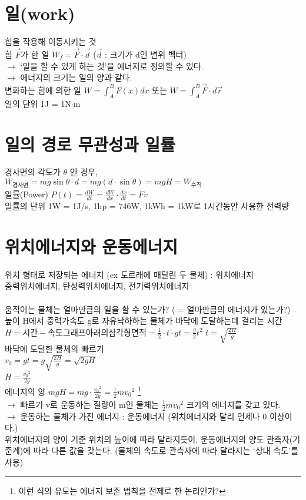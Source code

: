 \documentclass[10pt,a4paper]{report}
\begin{document}
	\section{일(work)}
	
	힘을 작용해 이동시키는 것\\
	힘 $\vec{F}$가 한 일 $W_f = \vec{F} \cdot \vec{d}$ ($\vec{d}$ : 크기가 d인 변위 벡터)\\
	$\rightarrow$ `일을 할 수 있게 하는 것'을 에너지로 정의할 수 있다.\\
	$\rightarrow$ 에너지의 크기는 일의 양과 같다.\\
	변화하는 힘에 의한 일 $W = \int_A^B F(x) dx$ 또는 $W = \int_A^B \vec{F} \cdot d\vec{r}$\\
	일의 단위 1J = 1N$\cdot$m
	
	\section{일의 경로 무관성과 일률}
	
	경사면의 각도가 $\theta$ 인 경우,\\
	$W_{경사면} = mg \sin \theta \cdot d = mg(d \cdot \sin \theta) = mgH = W_{수직}$\\
	일률(Power) $P(t) = \frac{dW}{dt} = \frac{dW}{dx} \cdot \frac{dx}{dt} = Fv$\\
	일률의 단위 1W = 1J/s, 1hp = 746W, 1kWh = 1kW로 1시간동안 사용한 전력량
	
	\section{위치에너지와 운동에너지}
	
	위치 형태로 저장되는 에너지 (ex 도르래에 매달린 두 물체) : 위치에너지\\
	중력위치에너지, 탄성력위치에너지, 전기력위치에너지\\
	\\
	움직이는 물체는 얼마만큼의 일을 할 수 있는가? ( = 얼마만큼의 에너지가 있는가?)\\
	높이 H에서 중력가속도 g로 자유낙하하는 물체가 바닥에 도달하는데 걸리는 시간\\
	$H = 시간-속도 그래프 아래의 삼각형 면적 = \frac{1}{2} \cdot t \cdot gt = \frac{g}{2} t^2$
	$t = \sqrt{\frac{2H}{g}}$\\
	바닥에 도달한 물체의 빠르기\\
	$v_0 = gt = g \sqrt{\frac{2H}{g}} = \sqrt{2gH}$\\
	$H = \frac{{v_0}^2}{2g}$\\
	에너지의 양 $mgH = mg \cdot \frac{{v_0}^2}{2g} = \frac{1}{2} m {v_0}^2$
	\footnote{이런 식의 유도는 에너지 보존 법칙을 전제로 한 논리인가?}\\
	$\rightarrow$ 빠르기 v로 운동하는 질량이 m인 물체는 $\frac{1}{2} m {v_0}^2$ 크기의 에너지를 갖고 있다.\\
	$\rightarrow$ 운동하는 물체가 가진 에너지 : 운동에너지 (위치에너지와 달리 언제나 0 이상이다.)\\
	위치에너지의 양이 기준 위치의 높이에 따라 달라지듯이, 운동에너지의 양도 관측자(기준계)에 따라 다른 값을 갖는다. (물체의 속도로 관측자에 따라 달라지는 `상대 속도'를 사용)
	
\end{document}
